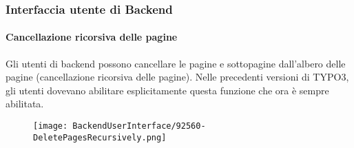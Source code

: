 %

\begin{frame}[fragile]
	\frametitle{Interfaccia utente di Backend}
	\framesubtitle{Cancellazione ricorsiva delle pagine}

    Gli utenti di backend possono cancellare le pagine e sottopagine dall'albero delle pagine
    (cancellazione ricorsiva delle pagine).
    Nelle precedenti versioni di TYPO3, gli utenti dovevano abilitare esplicitamente questa
    funzione che ora è sempre abilitata.

	\begin{figure}
		\texttt{[image: BackendUserInterface/92560-DeletePagesRecursively.png]}
	\end{figure}

\end{frame}

